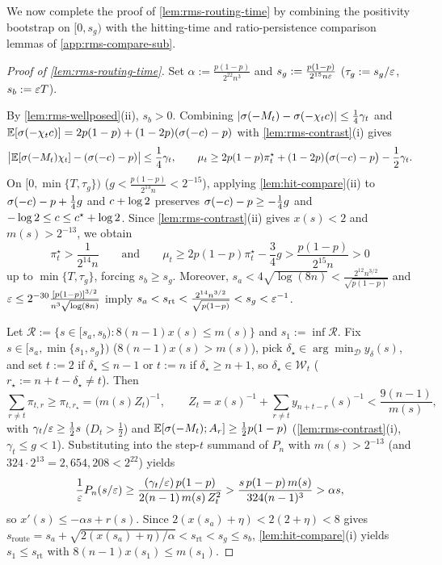 We now complete the proof of \cref{lem:rms-routing-time} by combining the positivity bootstrap on $[0, s_g)$ with the hitting-time and ratio-persistence comparison lemmas of \cref{app:rms-compare-sub}.

\begin{proof}[Proof of \cref{lem:rms-routing-time}]
Set $\alpha := \frac{p(1-p)}{2^{22}n^3}$ and $s_g := \frac{p(1-p)}{2^{15}n\varepsilon}$ ($\tau_g := s_g/\varepsilon$, $s_b := \varepsilon T$).

By \cref{lem:rms-wellposed}(ii), $s_b > 0$. Combining $|\sigma(-M_t) - \sigma(-\chi_tc)| \le \frac{1}{4}\gamma_t$ and $\mathbb E[\sigma(-\chi_tc)] = 2p(1-p) + (1-2p)(\sigma(-c) - p)$ with \cref{lem:rms-contrast}(i) gives
\[
  \bigl|\mathbb E[\sigma(-M_t)\chi_t] - (\sigma(-c) - p)\bigr| \le \frac{1}{4}\gamma_t,
  \qquad
  \mu_t \ge 2p(1-p)\pi_t^\star + (1-2p)\bigl(\sigma(-c) - p\bigr) - \frac{1}{2}\gamma_t.
\]
On $[0, \min\{T, \tau_g\})$ ($g < \frac{p(1-p)}{2^{13}n} < 2^{-15}$), applying \cref{lem:hit-compare}(ii) to $\sigma(-c) - p + \frac{1}{4}g$ and $c + \log 2$ preserves $\sigma(-c) - p \ge -\frac{1}{4}g$ and $-\log 2 \le c \le c^\star + \log 2$. Since \cref{lem:rms-contrast}(ii) gives $x(s) < 2$ and $m(s) > 2^{-13}$, we obtain
\[
  \pi_t^\star > \frac{1}{2^{14}n}
  \qquad\text{and}\qquad
  \mu_t \ge 2p(1-p)\pi_t^\star - \frac{3}{4}g > \frac{p(1-p)}{2^{15}n} > 0
\]
up to $\min\{T, \tau_g\}$, forcing $s_b \ge s_g$. Moreover, $s_a < 4\sqrt{\log(8n)} < \frac{2^{12}n^{3/2}}{\sqrt{p(1-p)}}$ and $\varepsilon \le 2^{-30}\frac{[p(1-p)]^{3/2}}{n^3\sqrt{\log(8n)}}$ imply $s_a < s_{\mathrm{rt}} < \frac{2^{14}n^{3/2}}{\sqrt{p(1-p)}} < s_g < \varepsilon^{-1}$.

Let $\mathcal R := \{s \in [s_a, s_b) : 8(n-1)x(s) \le m(s)\}$ and $s_1 := \inf\mathcal R$. Fix $s \in [s_a, \min\{s_1, s_g\})$ ($8(n-1)x(s) > m(s)$), pick $\delta_\star \in \arg\min_{\mathcal D} y_\delta(s)$, and set $t := 2$ if $\delta_\star \le n - 1$ or $t := n$ if $\delta_\star \ge n + 1$, so $\delta_\star \in \mathcal W_t$ ($r_\star := n + t - \delta_\star \ne t$). Then
\[
  \sum_{r\ne t}\pi_{t,r} \ge \pi_{t,r_\star} = \bigl(m(s)Z_t\bigr)^{-1}, \qquad
  Z_t = x(s)^{-1} + \sum_{r\ne t} y_{n+t-r}(s)^{-1} < \frac{9(n-1)}{m(s)},
\]
with $\gamma_t/\varepsilon \ge \frac{1}{2}s$ ($D_t > \frac{1}{2}$) and $\mathbb E[\sigma(-M_t); A_r] \ge \frac{1}{2}p(1-p)$ (\cref{lem:rms-contrast}(i), $\gamma_t \le g < 1$). Substituting into the step-$t$ summand of $P_n$ with $m(s) > 2^{-13}$ (and $324\cdot 2^{13} = 2{,}654{,}208 < 2^{22}$) yields
\begin{equation}
  \frac{1}{\varepsilon}P_n(s/\varepsilon)
  \ge \frac{(\gamma_t/\varepsilon)\,p(1-p)}{2(n-1)\,m(s)\,Z_t^2}
  > \frac{s\,p(1-p)\,m(s)}{324(n-1)^3}
  > \alpha s,
  \label{eq:rms-Pn-lower}
\end{equation}
so $x'(s) \le -\alpha s + r(s)$. Since $2(x(s_a) + \eta) < 2(2 + \eta) < 8$ gives $s_{\mathrm{route}} = s_a + \sqrt{2(x(s_a)+\eta)/\alpha} < s_{\mathrm{rt}} < s_g \le s_b$, \cref{lem:hit-compare}(i) yields $s_1 \le s_{\mathrm{rt}}$ with $8(n-1)x(s_1) \le m(s_1)$.


\end{proof}
